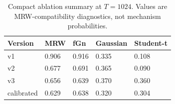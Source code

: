 \begin{table}[t]
\centering
\small
\caption{Compact ablation summary at \(T=1024\). Values are MRW-compatibility diagnostics, not mechanism probabilities.}
\label{tab:table4_ablation}
\begin{tabular}{lllll}
\toprule
Version & MRW & fGn & Gaussian & Student-t \\
\midrule
v1 & 0.906 & 0.916 & 0.335 & 0.108 \\
v2 & 0.677 & 0.691 & 0.365 & 0.090 \\
v3 & 0.656 & 0.639 & 0.370 & 0.360 \\
calibrated & 0.629 & 0.638 & 0.320 & 0.304 \\
\bottomrule
\end{tabular}
\end{table}
